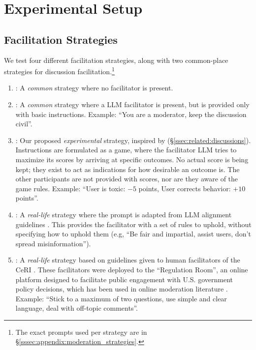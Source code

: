 \section{Experimental Setup}
\label{sec:experimental}

\subsection{Facilitation Strategies}
\label{ssec:experimental:strategies}

We test four different facilitation strategies, along with two common-place strategies for discussion facilitation.\footnote{The exact prompts used per strategy are in \S\ref{sssec:appendix:moderation_strategies}.}

\begin{enumerate}
    \item \textbf{\strategynomod}: A \emph{common} strategy where no facilitator is present.

    \item \textbf{\strategynoinstr}: A \emph{common} strategy where a \ac{LLM} facilitator is present, but is provided only with basic instructions. Example: “You are a moderator, keep the discussion civil”.

     \item \textbf{\strategymodgame}: Our proposed \emph{experimental} strategy, inspired by  \citet{abdelnabi_negotiations} (\S\ref{ssec:related:discussions}). Instructions are formulated as a game, where the facilitator \ac{LLM} tries to maximize its scores by arriving at specific outcomes. No actual score is being kept; they exist to act as indications for how desirable an outcome is. The other participants are not provided with scores, nor are they aware of the game rules. Example: ``User is toxic: $-5$ points, User corrects behavior: $+10$ points''.

    \item \textbf{\strategyrules}: A \emph{real-life} strategy where the prompt is adapted from \ac{LLM} alignment guidelines \cite{collective_constitution}. This provides the facilitator with a set of rules to uphold, without specifying how to uphold them (e.g, “Be fair and impartial, assist users, don't spread misinformation”).

    \item \textbf{\strategyregroom}: A \emph{real-life} strategy based on guidelines given to human facilitators of the \ac{CeRI} \citep{Cornell_eRulemaking2017}. These facilitators were deployed to the “Regulation Room”, an online platform designed to facilitate public engagement with U.S. government policy decisions, which has been used in online moderation literature \cite{seering_self_moderation, park_et_al_2012_facilitation}. Example: ``Stick to a maximum of two questions, use simple and clear language, deal with off-topic comments''.


\end{enumerate}
